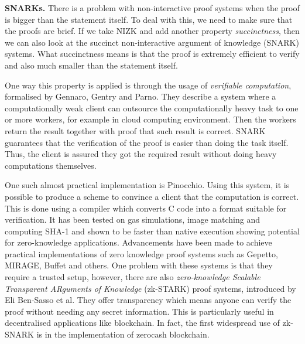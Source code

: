 \documentclass{Resources/UoBLab1}
\theoremstyle{definition}
\begin{document}
\noindent\textbf{SNARKs.} There is a problem with non-interactive proof systems when the proof is bigger than the statement itself. To deal with this, we need to make sure that the proofs are brief. If we take NIZK and add another property \textit{succinctness}, then we can also look at the succinct non-interactive argument of knowledge (SNARK) systems. What succinctness means is that the proof is extremely efficient to verify and also much smaller than the statement itself.

One way this property is applied is through the usage of \textit{verifiable computation}, formalised by Gennaro, Gentry and Parno\cite{UntrustedWorkers}. They describe a system where a computationally weak client can outsource the computationally heavy task to one or more workers, for example in cloud computing environment. Then the workers return the result together with proof that such result is correct. SNARK guarantees that the verification of the proof is easier than doing the task itself. Thus, the client is assured they got the required result without doing heavy computations themselves.

One such almost practical implementation is Pinocchio\cite{Pinocchio}. Using this system, it is possible to produce a scheme to convince a client that the computation is correct. This is done using a compiler which converts C code into a format suitable for verification. It has been tested on gas simulations, image matching and computing SHA-1 and shown to be faster than native execution showing potential for zero-knowledge applications. Advancements have been made to achieve practical implementations of zero knowledge proof systems such as Gepetto\cite{Gepetto}, MIRAGE\cite{Mirage}, Buffet\cite{Buffet} and others. One problem with these systems is that they require a trusted setup, however, there are also \textit{zero-knowledge Scalable Transparent ARguments of Knowledge} (zk-STARK) proof systems, introduced by Eli Ben-Sasso et al\cite{STARK}. They offer transparency which means anyone can verify the proof without needing any secret information. This is particularly useful in decentralised applications like blockchain. In fact, the first widespread use of zk-SNARK is in the implementation of zerocash blockchain\cite{zcash}.\medskip
\end{document}

